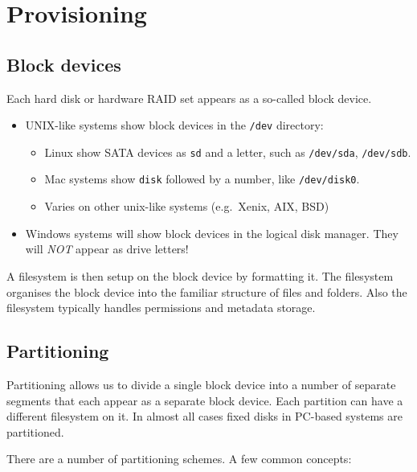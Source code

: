 \chapter{Provisioning}
\label{ch:provisioning}

\section{Block devices}
\label{sec:block-devices}

Each hard disk or hardware RAID set appears as a so-called block device.

\begin{itemize}
\item
  UNIX-like systems show block devices in the \texttt{/dev} directory:

  \begin{itemize}
  \item
    Linux show SATA devices as \texttt{sd} and a letter, such as
    \texttt{/dev/sda}, \texttt{/dev/sdb}.
  \item
    Mac systems show \texttt{disk} followed by a number, like
    \texttt{/dev/disk0}.
  \item
    Varies on other unix-like systems (e.g.~Xenix, AIX, BSD)
  \end{itemize}
\item
  Windows systems will show block devices in the logical disk manager.
  They will \emph{NOT} appear as drive letters!
\end{itemize}

A filesystem is then setup on the block device by formatting it. The
filesystem organises the block device into the familiar structure of
files and folders. Also the filesystem typically handles permissions and
metadata storage.

\section{Partitioning}
\label{sec:partitioning}

Partitioning allows us to divide a single block device into a number of
separate segments that each appear as a separate block device. Each
partition can have a different filesystem on it. In almost all cases
fixed disks in PC-based systems are partitioned.

There are a number of partitioning schemes. A few common concepts:

